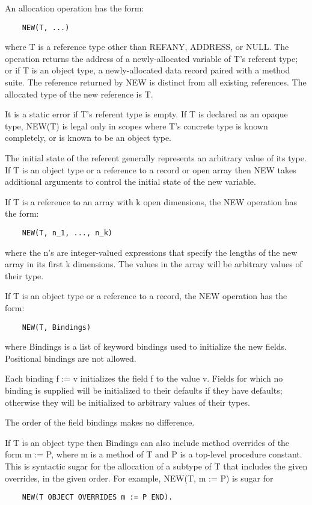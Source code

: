 \documentclass[10pt]{article}
\begin{document}
An allocation operation has the form:
\begin{verbatim}
    NEW(T, ...)
\end{verbatim}
where T is a reference type other than REFANY, ADDRESS, or NULL.  The operation
returns the address of a newly-allocated variable of T's referent type; or if
T is an object type, a newly-allocated data record paired with a method
suite.  The reference returned by NEW is distinct from all existing
references.  The allocated type of the new reference is T.

It is a static error if T's referent type is empty.  If T is declared as an
opaque type, NEW(T) is legal only in scopes where T's concrete type is known
completely, or is known to be an object type.

The initial state of the referent generally represents an arbitrary value of
its type.  If T is an object type or a reference to a record or open array then
NEW takes additional arguments to control the initial state of the new
variable.

If T is a reference to an array with k open dimensions, the NEW operation has
the form:
\begin{verbatim}
    NEW(T, n_1, ..., n_k)
\end{verbatim}
where the n's are integer-valued expressions that specify the lengths of the
new array in its first k dimensions.  The values in the array will be arbitrary
values of their type.

If T is an object type or a reference to a record, the NEW operation has the
form:
\begin{verbatim}
    NEW(T, Bindings)
\end{verbatim}
where Bindings is a list of keyword bindings used to initialize the new
fields.  Positional bindings are not allowed.

Each binding f := v initializes the field f to the value v.  Fields for which
no binding is supplied will be initialized to their defaults if they have
defaults; otherwise they will be initialized to arbitrary values of their
types.

The order of the field bindings makes no difference.

If T is an object type then Bindings can also include method overrides of the
form m := P, where m is a method of T and P is a top-level procedure
constant.  This is syntactic sugar for the allocation of a subtype of T that
includes the given overrides, in the given order.  For example, NEW(T, m := P)
is sugar for
\begin{verbatim}
    NEW(T OBJECT OVERRIDES m := P END).
\end{verbatim}
\end{document}
